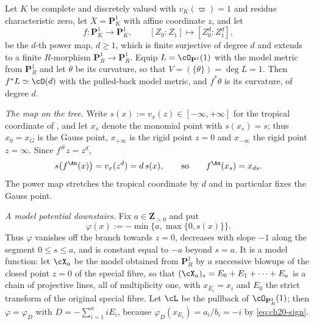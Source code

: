 \begin{example}
\label{ex:ch30-power-map}
Let \(K\) be complete and discretely valued with \(v_K(\varpi)=1\) and
residue characteristic zero, let \(X=\mathbf P^1_K\) with affine coordinate
\(z\), and let
\[
 f:\mathbf P^1_K\longrightarrow\mathbf P^1_K,
 \qquad
 [Z_0:Z_1]\longmapsto[Z_0^d:Z_1^d],
\]
be the \(d\)-th power map, \(d\geq1\), which is finite surjective of degree
\(d\) and extends to a finite \(R\)-morphism
\(\mathbf P^1_R\to\mathbf P^1_R\).  Equip \(L=\cO_{\mathbf P^1}(1)\) with the
model metric from \(\mathbf P^1_{R}\) and let \(\theta\) be its curvature,
so that \(V=(\{\theta\})=\deg L=1\).  Then \(f^*L\simeq\cO(d)\) with the
pulled-back model metric, and \(f^*\theta\) is its curvature, of degree
\(d\).

\emph{The map on the tree.}  Write \(s(x):=v_x(z)\in[-\infty,+\infty]\) for
the tropical coordinate of , and let \(x_s\) denote
the monomial point with \(s(x_s)=s\); thus \(x_0=x_G\) is the Gauss point,
\(x_{+\infty}\) is the rigid point \(z=0\) and \(x_{-\infty}\) the rigid
point \(z=\infty\).  Since \(f^\#z=z^d\),
\begin{equation}
\label{eq:ch30-power-map-tropical}
 s\bigl(f^{\An}(x)\bigr)=v_x(z^d)=d\,s(x),
 \qquad\text{so}\qquad f^{\An}(x_s)=x_{ds}.
\end{equation}
The power map stretches the tropical coordinate by \(d\) and in particular
fixes the Gauss point.

\emph{A model potential downstairs.}  Fix \(a\in\mathbf Z_{>0}\) and put
\begin{equation}
\label{eq:ch30-power-map-potential}
 \varphi(x):=-\min\bigl\{a,\max\{0,s(x)\}\bigr\}.
\end{equation}
Thus \(\varphi\) vanishes off the branch towards \(z=0\), decreases with
slope \(-1\) along the segment \(0\leq s\leq a\), and is constant equal to
\(-a\) beyond \(s=a\).  It is a model function: let \(\cX_a\) be the model
obtained from \(\mathbf P^1_R\) by \(a\) successive blowups of the closed
point \(z=0\) of the special fibre, so that
\((\cX_a)_s=E_0+E_1+\cdots+E_a\) is a chain of projective lines, all of
multiplicity one, with \(x_{E_i}=x_i\) and \(E_0\) the strict transform of
the original special fibre.  Let \(\cL\) be the pullback of
\(\cO_{\mathbf P^1_R}(1)\); then \(\varphi=\varphi_D\) with
\(D=-\sum_{i=1}^{a}iE_i\), because \(\varphi_D(x_{E_i})=a_i/b_i=-i\) by
\eqref{eq:ch20-sign}.


\end{example}
